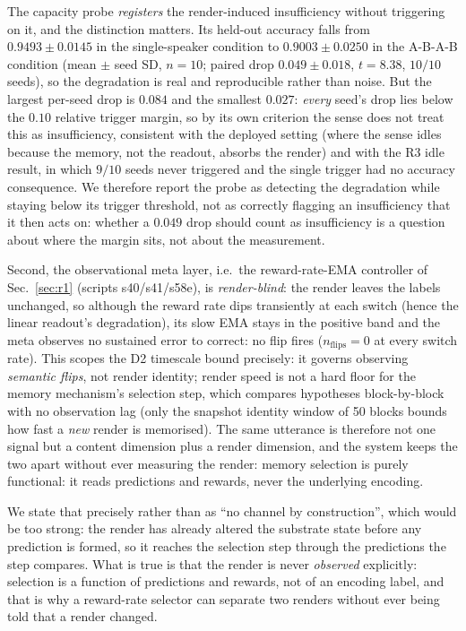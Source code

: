 \documentclass[preprint,12pt]{elsarticle}
\begin{document}
The capacity probe \emph{registers} the
render-induced insufficiency without triggering on it, and the distinction
matters. Its held-out accuracy falls from $0.9493\pm0.0145$ in the
single-speaker condition to $0.9003\pm0.0250$ in the A-B-A-B condition
(mean $\pm$ seed SD, $n=10$; paired drop $0.049\pm0.018$, $t=8.38$, $10/10$
seeds), so the degradation is real and reproducible rather than noise. But the
largest per-seed drop is $0.084$ and the smallest $0.027$: \emph{every} seed's
drop lies below the $0.10$ relative trigger margin, so by its own criterion the
sense does not treat this as insufficiency, consistent with the deployed
setting (where the sense idles because the memory, not the readout, absorbs
the render) and with the R3 idle result, in which
$9/10$ seeds never triggered and the single trigger had no accuracy
consequence. We therefore report the probe as detecting the degradation while
staying below its trigger threshold, not as correctly flagging an
insufficiency that it then acts on: whether a $0.049$ drop should count as
insufficiency is a question about where the margin sits, not about the
measurement.

Second, the observational meta layer, i.e.\ the reward-rate-EMA controller of
Sec.~\ref{sec:r1} (scripts s40/s41/s58e), is
\emph{render-blind}: the render leaves the labels unchanged, so although
the reward rate dips transiently at each switch (hence the linear readout's
degradation), its slow EMA stays in the positive band and the meta observes
no sustained error to correct: no flip fires ($n_{\mathrm{flips}}=0$ at
every switch rate). This scopes the D2 timescale bound precisely: it governs
observing \emph{semantic flips}, not render identity; render speed is
not a hard floor for the memory mechanism's selection step, which compares
hypotheses block-by-block with no observation lag (only the snapshot
identity window of 50 blocks bounds how fast a \emph{new} render is
memorised). The same utterance is therefore not one signal but a content
dimension plus a render dimension, and the system keeps the two apart
without ever measuring the render: memory selection is purely functional:
it reads predictions and rewards, never the underlying encoding.

We state
that precisely rather than as ``no channel by construction'', which would be
too strong: the render has already altered the substrate state before any
prediction is formed, so it reaches the selection step through the predictions
the step compares. What is true is that the render is never \emph{observed}
explicitly: selection is a function of predictions and rewards, not of an
encoding label, and that is why a reward-rate selector can separate two
renders without ever being told that a render changed.
\end{document}

